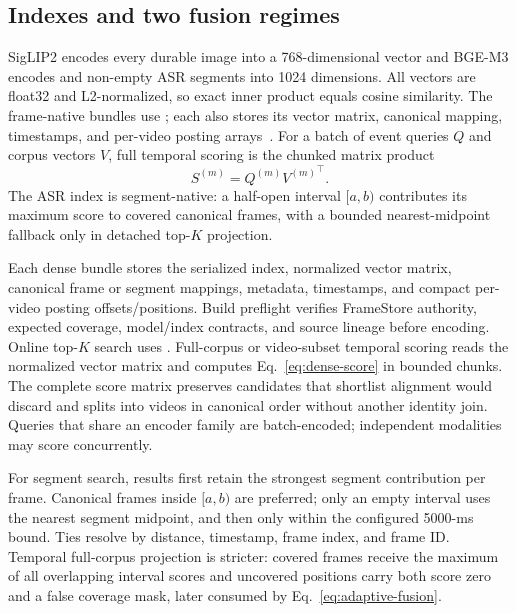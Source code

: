 \subsection{Indexes and two fusion regimes}

SigLIP2 encodes every durable image into a 768-dimensional vector and BGE-M3
encodes \FrameContext{} and non-empty ASR segments into 1024 dimensions. All
vectors are float32 and L2-normalized, so exact inner product equals cosine
similarity. The frame-native bundles use \FAISS{} ; each also
stores its vector matrix, canonical mapping, timestamps, and per-video posting
arrays~\cite{faiss}. For a batch of event queries $Q$ and corpus vectors $V$,
full temporal scoring is the chunked matrix product
\begin{equation}
 S^{(m)}=Q^{(m)}{V^{(m)}}^{\!\top}.
 \label{eq:dense-score}
\end{equation}
The ASR index is segment-native: a half-open interval $[a,b)$ contributes its
maximum score to covered canonical frames, with a bounded nearest-midpoint
fallback only in detached top-$K$ projection.

Each dense bundle stores the serialized index, normalized vector matrix, canonical frame
or segment mappings, metadata, timestamps, and compact per-video posting
offsets/positions. Build preflight verifies FrameStore authority, expected
coverage, model/index contracts, and source lineage before encoding. Online
top-$K$ search uses \FAISS. Full-corpus or video-subset temporal scoring reads the
normalized vector matrix and computes Eq.~\ref{eq:dense-score} in bounded chunks.
The complete score matrix preserves candidates that shortlist alignment would
discard and splits into videos in canonical order without another identity join.
Queries that share an encoder family are batch-encoded; independent modalities
may score concurrently.

For segment search, results first retain the strongest segment contribution per
frame. Canonical frames inside $[a,b)$ are preferred; only an empty interval uses
the nearest segment midpoint, and then only within the configured 5000-ms bound.
Ties resolve by distance, timestamp, frame index, and frame ID. Temporal
full-corpus projection is stricter: covered frames receive the maximum of all
overlapping interval scores and uncovered positions carry both score zero and a
false coverage mask, later consumed by Eq.~\ref{eq:adaptive-fusion}.

